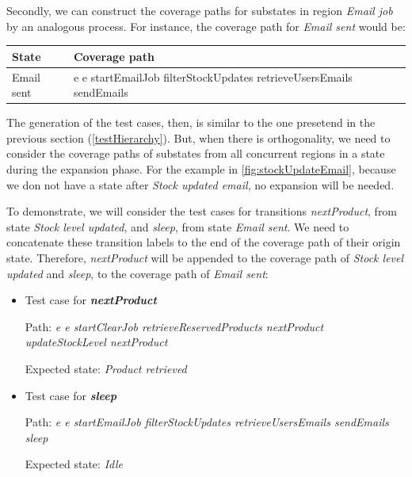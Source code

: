 Secondly, we can construct the coverage paths for substates in region \textit{Email job} by an analogous process. For instance, the coverage path for \textit{Email sent} would be:

\begin{center}
\begin{tabular}{| p{4cm} | p{10cm}|}

\hline

State & Coverage path \\ \hline

Email sent & e e  startEmailJob filterStockUpdates retrieveUsersEmails sendEmails\\ 
\hline
\end{tabular}
\end{center}

The generation of the test cases, then, is similar to the one presetend in the previous section (\ref{testHierarchy}). But, when there is orthogonality, we need to consider the coverage paths of substates from all concurrent regions in a state during the expansion phase. For the example in \ref{fig:stockUpdateEmail}, because we don not have a state after \textit{Stock updated email}, no expansion will be needed.

To demonstrate, we will consider the test cases for transitions \textit{nextProduct}, from state \textit{Stock level updated}, and \textit{sleep}, from state \textit{Email sent}. We need to concatenate these transition labels to the end of the coverage path of their origin state. Therefore, \textit{nextProduct} will be appended to the coverage path of \textit{Stock level updated} and \textit{sleep}, to the coverage path of \textit{Email sent}:

\begin{itemize}

\item Test case for \textit{\textbf{nextProduct}}

Path: \textit{e e startClearJob retrieveReservedProducts nextProduct updateStockLevel nextProduct}

Expected state: \textit{Product retrieved}

\item Test case for \textit{\textbf{sleep}}

Path: \textit{e e  startEmailJob filterStockUpdates retrieveUsersEmails sendEmails sleep}

Expected state: \textit{Idle}

\end{itemize}
